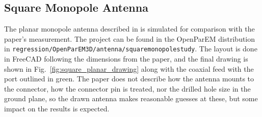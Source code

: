 \documentclass[titlepage]{article}
\renewcommand\_{\textunderscore\linebreak[1]}
\begin{document}
\subsection{Square Monopole Antenna}

The planar monopole antenna described in \cite{Wong} is simulated for comparison with the paper's measurement.  The project can be found in the OpenParEM distribution in \texttt{regression/OpenParEM3D/antenna/square\_monopole\_study}.  The layout is done in FreeCAD following the dimensions from the paper, and the final drawing is shown in Fig.~\ref{fig:square_planar_drawing} along with the coaxial feed with the port outlined in green.  The paper does not describe how the antenna mounts to the connector, how the connector pin is treated, nor the drilled hole size in the ground plane, so the drawn antenna makes reasonable guesses at these, but some impact on the results is expected.
\end{document}
